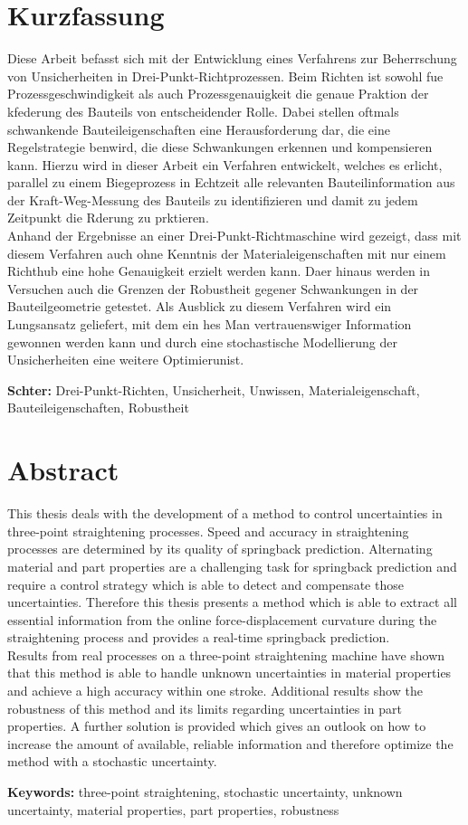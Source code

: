 \section*{Kurzfassung}
Diese Arbeit befasst sich mit der Entwicklung eines Verfahrens zur Beherrschung von Unsicherheiten in Drei-Punkt-Richtprozessen. Beim Richten ist sowohl fue Prozessgeschwindigkeit als auch Prozessgenauigkeit die genaue Praktion der kfederung des Bauteils von entscheidender Rolle. Dabei stellen oftmals schwankende Bauteileigenschaften eine Herausforderung dar,  die eine Regelstrategie benwird, die diese Schwankungen erkennen und kompensieren kann. Hierzu wird in dieser Arbeit ein Verfahren entwickelt, welches es erlicht, parallel zu einem Biegeprozess in Echtzeit alle relevanten Bauteilinformation aus der Kraft-Weg-Messung des Bauteils zu identifizieren und damit zu jedem Zeitpunkt die Rderung zu prktieren.\\
Anhand der Ergebnisse an einer Drei-Punkt-Richtmaschine wird gezeigt, dass mit diesem Verfahren auch ohne Kenntnis der Materialeigenschaften mit nur einem Richthub eine hohe Genauigkeit erzielt werden kann. Daer hinaus werden in Versuchen auch die Grenzen der Robustheit gegener Schwankungen in der Bauteilgeometrie getestet. Als Ausblick zu diesem Verfahren wird ein Lungsansatz geliefert, mit dem ein hes Man vertrauenswiger Information gewonnen werden kann und durch eine stochastische Modellierung der Unsicherheiten eine weitere Optimierunist. 

\textbf{Schter:} Drei-Punkt-Richten, Unsicherheit, Unwissen, Materialeigenschaft, Bauteileigenschaften, Robustheit


\section*{Abstract} 

This thesis deals with the development of a method to control uncertainties in three-point straightening processes. Speed and accuracy in straightening processes are determined by its quality of springback prediction. Alternating material and part properties are a challenging task for springback prediction and require a control strategy which is able to detect and compensate those uncertainties. Therefore this thesis presents a method which is able to extract all essential information from the online force-displacement curvature during the straightening process and provides a real-time springback prediction.\\
Results from real processes on a three-point straightening machine have shown that this method is able to handle unknown uncertainties in material properties and achieve a high accuracy within one stroke. Additional results show the robustness of this method and its limits regarding uncertainties in part properties. A further solution is provided which gives an outlook on how to increase the amount of available, reliable information and therefore optimize the method with a stochastic uncertainty.

\textbf{Keywords:} three-point straightening, stochastic uncertainty, unknown uncertainty, material properties, part properties, robustness
